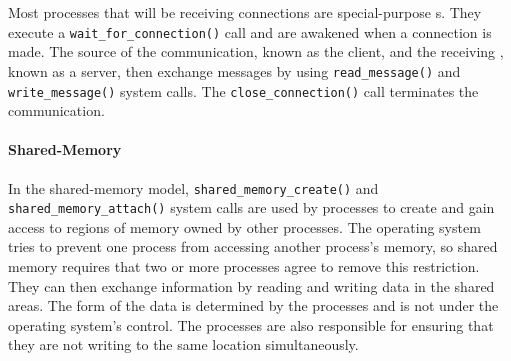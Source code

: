 Most processes that will be receiving connections are special-purpose s.
They execute a \texttt{wait_for_connection()} call and are awakened when a connection is made.
The source of the communication, known as the client, and the receiving , known as a server, then exchange messages by using \texttt{read_message()} and \texttt{write_message()} system calls.
The \texttt{close_connection()} call terminates the communication.

\paragraph{Shared-Memory}\label{par:Shared_Memory}
In the shared-memory model, \texttt{shared_memory_create()} and \texttt{shared_memory_attach()} system calls are used by processes to create and gain access to regions of memory owned by other processes.
The operating system tries to prevent one process from accessing another process’s memory, so shared memory requires that two or more processes agree to remove this restriction.
They can then exchange information by reading and writing data in the shared areas.
The form of the data is determined by the processes and is not under the operating system’s control.
The processes are also responsible for ensuring that they are not writing to the same location simultaneously.


